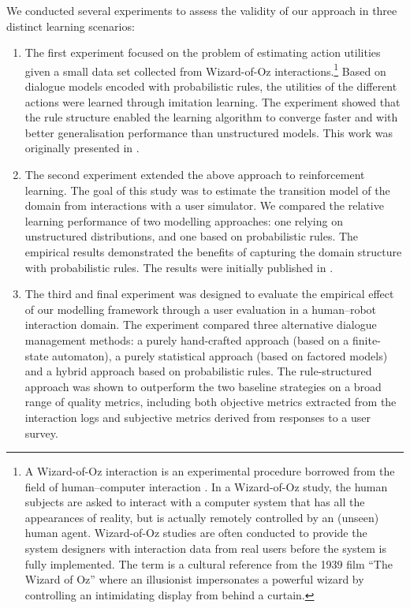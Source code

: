 We conducted several experiments to assess the validity of our approach in three distinct learning scenarios: \begin{enumerate} %

\item The first experiment focused on the problem of estimating action utilities given a small data set collected from Wizard-of-Oz interactions.\footnote{A Wizard-of-Oz interaction is an experimental procedure borrowed from the field of human--computer interaction \citep{woz93}. In a Wizard-of-Oz study, the human subjects are asked to interact with a computer system that has all the appearances of reality, but is actually remotely controlled by an (unseen) human agent.  Wizard-of-Oz studies are often conducted to provide the system designers with interaction data from real users before the system is fully implemented.  The term is a cultural reference from the 1939 film ``The Wizard of Oz'' where an illusionist impersonates a powerful wizard by controlling an intimidating display from behind a curtain.}  Based on dialogue models encoded with probabilistic rules, the utilities of the different actions were learned through imitation learning. The experiment showed that the rule structure enabled the learning algorithm to converge faster and with better generalisation performance than unstructured models. This work was originally presented in \cite{rulebasedmodels-sigdial2012}. 
\item The second experiment extended the above approach to reinforcement learning. The goal of this study was to estimate the transition model of the domain from interactions with a user simulator. We compared the relative learning performance of two modelling approaches: one relying on unstructured distributions, and one based on probabilistic rules. The empirical results demonstrated the benefits of capturing the domain structure with probabilistic rules. The results were initially published in \cite{interspeech2013}. 

\item The third and final experiment was designed to evaluate the empirical effect of our modelling framework through a user evaluation in a human--robot interaction domain. The experiment compared three alternative dialogue management methods: a purely hand-crafted approach (based on a finite-state automaton), a purely statistical approach (based on factored models) and a hybrid approach based on probabilistic rules. The rule-structured approach was shown to outperform the two baseline strategies on a broad range of quality metrics, including both objective metrics extracted from the interaction logs and subjective metrics derived from responses to a user survey. 
\end{enumerate}

